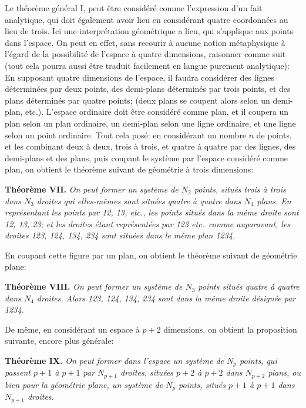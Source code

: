 \documentclass[12pt,a4paper]{article}
\begin{document}
Le th\'eor\`eme g\'en\'eral I, peut \^etre consid\'er\'e comme l'expression d'un fait analytique, qui doit \'egalement avoir lieu en consid\'erant quatre coordonn\'ees au lieu de trois. Ici une interpr\'etation g\'eom\'etrique a lieu, qui s'applique aux points dans l'espace. On peut en effet, sans recourir \`a aucune notion m\'etaphysique \`a l'\'egard de la possibilit\'e de l'espace \`a quatre dimensions, raisonner comme suit (tout cela pourra aussi \^etre traduit facilement en langue purement analytique): En supposant quatre dimensions de l'espace, il faudra consid\'erer des lignes d\'etermin\'ees par deux points, des demi-plans d\'etermin\'es par trois points, et des plans d\'etermin\'es par quatre points; (deux plans se coupent alors selon un demi-plan, etc.). L'espace ordinaire doit \^etre consid\'er\'e comme plan, et il coupera un plan selon un plan ordinaire, un demi-plan selon une ligne ordinaire, et une ligne selon un point ordinaire. Tout cela pos\'e: en consid\'erant un nombre $n$ de points, et les combinant deux \`a deux, trois \`a trois, et quatre \`a quatre par des lignes, des demi-plans et des plans, puis coupant le syst\`eme par l'espace consid\'er\'e comme plan, on obtient le th\'eor\`eme suivant de g\'eom\'etrie \`a trois dimensions:

\textbf{Th\'eor\`eme VII.} \emph{On peut former un syst\`eme de $N_2$ points, situ\'es trois \`a trois dans $N_3$ droites qui elles-m\^emes sont situ\'ees quatre \`a quatre dans $N_4$ plans. En repr\'esentant les points par 12, 13, etc., les points situ\'es dans la m\^eme droite sont 12, 13, 23; et les droites \'etant repr\'esent\'ees par 123 etc.\ comme auparavant, les droites 123, 124, 134, 234 sont situ\'ees dans le m\^eme plan 1234.}

En coupant cette figure par un plan, on obtient le th\'eor\`eme suivant de g\'eom\'etrie plane:

\textbf{Th\'eor\`eme VIII.} \emph{On peut former un syst\`eme de $N_3$ points situ\'es quatre \`a quatre dans $N_4$ droites. Alors 123, 124, 134, 234 sont dans la m\^eme droite d\'esign\'ee par 1234.}

De m\^eme, en consid\'erant un espace \`a $p + 2$ dimensions, on obtient la proposition suivante, encore plus g\'en\'erale:

\textbf{Th\'eor\`eme IX.} \emph{On peut former dans l'espace un syst\`eme de $N_p$ points, qui passent $p + 1$ \`a $p + 1$ par $N_{p+1}$ droites, situ\'ees $p + 2$ \`a $p + 2$ dans $N_{p+2}$ plans, ou bien pour la g\'eom\'etrie plane, un syst\`eme de $N_p$ points, situ\'es $p + 1$ \`a $p + 1$ dans $N_{p+1}$ droites.}
\end{document}
